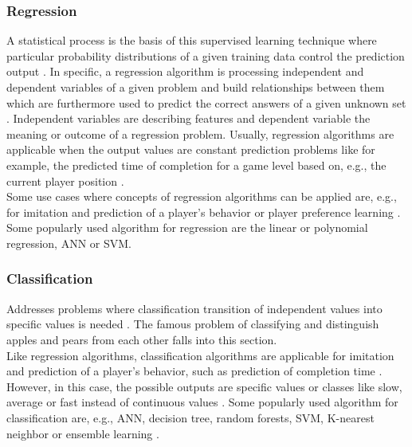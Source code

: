 \documentclass[MGS,Master,english]{twbook}%
\begin{document}
\subsubsection{Regression}
A statistical process is the basis of this supervised learning technique where particular probability distributions of a given training data control the prediction output \cite{ml::book::developer}. In specific, a regression algorithm is processing independent and dependent variables of a given problem and build relationships between them which are furthermore used to predict the correct answers of a given unknown set \cite{ml::book::developer}. Independent variables are describing features and dependent variable the meaning or outcome of a regression problem. Usually, regression algorithms are applicable when the output values are constant prediction problems like for example, the predicted time of completion for a game level based on, e.g., the current player position \cite{ai::book}.\\
Some use cases where concepts of regression algorithms can be applied are, e.g., for imitation and prediction of a player's behavior or player preference learning \cite{ai::book}. Some popularly used algorithm for regression are the linear or polynomial regression, \ac{ANN} or \ac{SVM}. \cite{ai::book}

\subsubsection{Classification}
Addresses problems where classification transition of independent values into specific values is needed \cite{ai::book}. The famous problem of classifying and distinguish apples and pears from each other falls into this section.\\
Like regression algorithms, classification algorithms are applicable for imitation and prediction of a player's behavior, such as prediction of completion time \cite{ai::book}. However, in this case, the possible outputs are specific values or classes like slow, average or fast instead of continuous values \cite{ai::book}. Some popularly used algorithm for classification are, e.g., \ac{ANN}, decision tree, random forests, \ac{SVM}, K-nearest neighbor or ensemble learning \cite{ai::book}.
\end{document}
